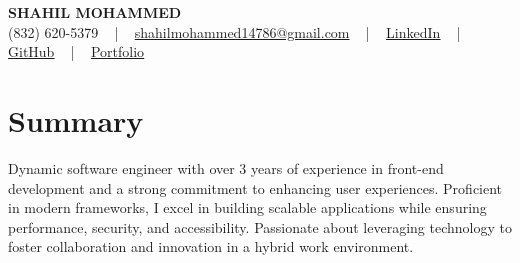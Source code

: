 \documentclass[letterpaper,10pt]{article}
\begin{document}
\begin{center}
    {\fontsize{14pt}{12pt}\selectfont \textbf{\MakeUppercase{Shahil Mohammed}}}\\ \vspace{2pt}
    \fontsize{10pt}{12pt}\selectfont (832) 620-5379 ~ | ~ \href{mailto:shahilmohammed14786@gmail.com}{shahilmohammed14786@gmail.com} ~ | ~  
    \href{https://www.linkedin.com/in/shahil-mohammed-9652931a1/}{\color{blue}\underline{LinkedIn}}  ~ | ~ 
    \href{https://github.com/freakbeast14}{\color{blue}\underline{GitHub}} ~ | ~ 
    \href{https://shahil-mohammed.netlify.app/}{\color{blue}\underline{Portfolio}}
    \vspace{-8pt}
\end{center}

\section{Summary}
\vspace{-2pt}\fontsize{8pt}{9pt}\selectfont
Dynamic software engineer with over 3 years of experience in front-end development and a strong commitment to enhancing user experiences. Proficient in modern frameworks, I excel in building scalable applications while ensuring performance, security, and accessibility. Passionate about leveraging technology to foster collaboration and innovation in a hybrid work environment.
 \vspace{-5pt}
 
\vspace{-2pt}
\end{document}
